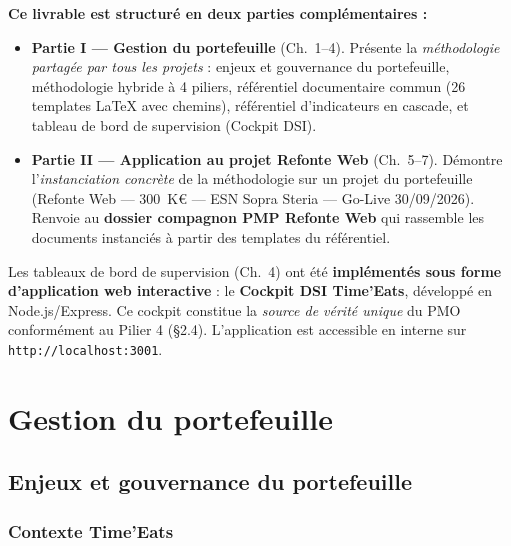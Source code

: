 \documentclass[11pt,a4paper,oneside]{report}
\begin{document}
\textbf{Ce livrable est structuré en deux parties complémentaires :}

\begin{itemize}
  \item \textbf{Partie I --- Gestion du portefeuille} (Ch.\ 1--4). Présente la \emph{méthodologie partagée par tous les projets} : enjeux et gouvernance du portefeuille, méthodologie hybride à 4 piliers, référentiel documentaire commun (26 templates LaTeX avec chemins), référentiel d'indicateurs en cascade, et tableau de bord de supervision (Cockpit DSI).
  \item \textbf{Partie II --- Application au projet Refonte Web} (Ch.\ 5--7). Démontre l'\emph{instanciation concrète} de la méthodologie sur un projet du portefeuille (Refonte Web --- 300~K€ --- ESN Sopra Steria --- Go-Live 30/09/2026). Renvoie au \textbf{dossier compagnon PMP Refonte Web} qui rassemble les documents instanciés à partir des templates du référentiel.
\end{itemize}

\begin{reco}
Les tableaux de bord de supervision (Ch.\ 4) ont été \textbf{implémentés sous forme d'application web interactive} : le \textbf{Cockpit DSI Time'Eats}, développé en Node.js/Express. Ce cockpit constitue la \textit{source de vérité unique} du PMO conformément au Pilier 4 (§2.4). L'application est accessible en interne sur \texttt{http://localhost:3001}.
\end{reco}

\newpage

\part{Gestion du portefeuille}

\chapter{Enjeux et gouvernance du portefeuille}

\section{Contexte Time'Eats}
\end{document}

